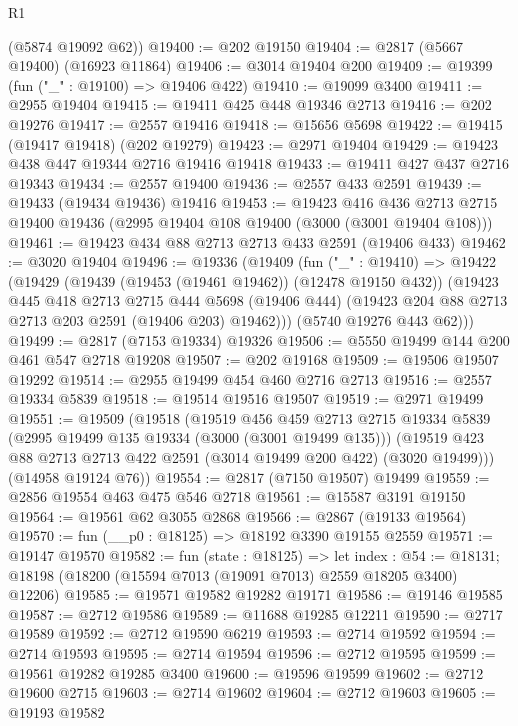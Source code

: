 \begin{lexlean}{R1}
\begin{coremodule}
      (@5874 @19092 @62))
@19400 := @202 @19150
@19404 := @2817 (@5667 @19400) (@16923 @11864)
@19406 := @3014 @19404 @200
@19409 := @19399 (fun ("_" : @19100) => @19406 @422)
@19410 := @19099 @3400
@19411 := @2955 @19404
@19415 := @19411 @425 @448 @19346 @2713
@19416 := @202 @19276
@19417 := @2557 @19416
@19418 := @15656 @5698
@19422 := @19415 (@19417 @19418) (@202 @19279)
@19423 := @2971 @19404
@19429 := @19423 @438 @447 @19344 @2716 @19416 @19418
@19433 := @19411 @427 @437 @2716 @19343
@19434 := @2557 @19400
@19436 := @2557 @433 @2591
@19439 := @19433 (@19434 @19436) @19416
@19453 := @19423
    @416
    @436
    @2713
    @2715
    @19400
    @19436
    (@2995 @19404 @108 @19400 (@3000 (@3001 @19404 @108)))
@19461 := @19423 @434 @88 @2713 @2713 @433 @2591 (@19406 @433)
@19462 := @3020 @19404
@19496 := @19336
    (@19409
      (fun ("_" : @19410) =>
      @19422
        (@19429
          (@19439 (@19453 (@19461 @19462)) (@12478 @19150 @432))
          (@19423
            @445
            @418
            @2713
            @2715
            @444
            @5698
            (@19406 @444)
            (@19423 @204 @88 @2713 @2713 @203 @2591 (@19406 @203) @19462)))
        (@5740 @19276 @443 @62)))
@19499 := @2817 (@7153 @19334) @19326
@19506 := @5550 @19499 @144 @200 @461 @547 @2718 @19208
@19507 := @202 @19168
@19509 := @19506 @19507 @19292
@19514 := @2955 @19499 @454 @460 @2716 @2713
@19516 := @2557 @19334 @5839
@19518 := @19514 @19516 @19507
@19519 := @2971 @19499
@19551 := @19509
    (@19518
      (@19519
        @456
        @459
        @2713
        @2715
        @19334
        @5839
        (@2995 @19499 @135 @19334 (@3000 (@3001 @19499 @135)))
        (@19519 @423 @88 @2713 @2713 @422 @2591 (@3014 @19499 @200 @422) (@3020 @19499)))
      (@14958 @19124 @76))
@19554 := @2817 (@7150 @19507) @19499
@19559 := @2856 @19554 @463 @475 @546 @2718
@19561 := @15587 @3191 @19150
@19564 := @19561 @62 @3055 @2868
@19566 := @2867 (@19133 @19564)
@19570 := fun (__p0 : @18125) => @18192 @3390 @19155 @2559
@19571 := @19147 @19570
@19582 := fun (state : @18125) =>
  let index : @54 := @18131; @18198 (@18200 (@15594 @7013 (@19091 @7013) @2559 @18205 @3400) @12206)
@19585 := @19571 @19582 @19282 @19171
@19586 := @19146 @19585
@19587 := @2712 @19586
@19589 := @11688 @19285 @12211
@19590 := @2717 @19589
@19592 := @2712 @19590 @6219
@19593 := @2714 @19592
@19594 := @2714 @19593
@19595 := @2714 @19594
@19596 := @2712 @19595
@19599 := @19561 @19282 @19285 @3400
@19600 := @19596 @19599
@19602 := @2712 @19600 @2715
@19603 := @2714 @19602
@19604 := @2712 @19603
@19605 := @19193 @19582

\end{coremodule}
\end{lexlean}
